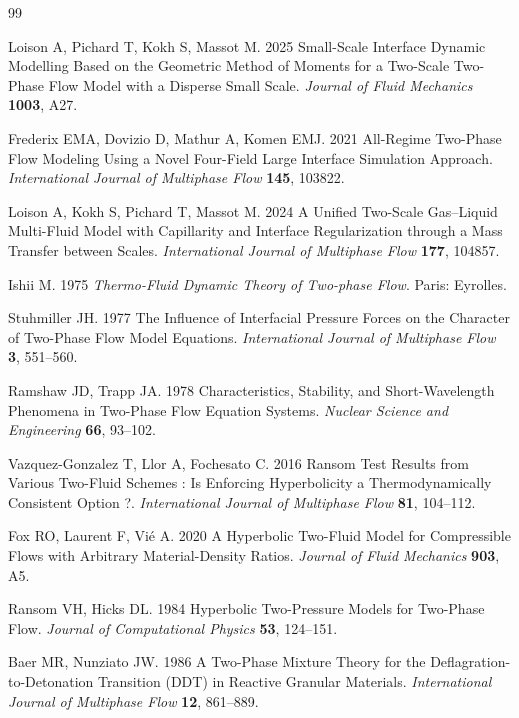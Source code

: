 \documentclass{myclass}
\begin{document}
\vskip2pc



\begin{thebibliography}{99}

Loison A, Pichard T, Kokh S, Massot M. 2025  Small-Scale Interface Dynamic
  Modelling Based on the Geometric Method of Moments for a Two-Scale Two-Phase
  Flow Model with a Disperse Small Scale. {\em Journal of Fluid Mechanics}
  \textbf{1003}, A27.

Frederix EMA, Dovizio D, Mathur A, Komen EMJ. 2021  All-Regime Two-Phase Flow
  Modeling Using a Novel Four-Field Large Interface Simulation Approach. {\em
  International Journal of Multiphase Flow} \textbf{145}, 103822.

Loison A, Kokh S, Pichard T, Massot M. 2024  A Unified Two-Scale Gas--Liquid
  Multi-Fluid Model with Capillarity and Interface Regularization through a
  Mass Transfer between Scales. {\em International Journal of Multiphase Flow}
  \textbf{177}, 104857.

Ishii M. 1975 {\em Thermo-Fluid {{Dynamic Theory}} of {{Two-phase Flow}}}.
Paris: Eyrolles.

Stuhmiller JH. 1977  The Influence of Interfacial Pressure Forces on the
  Character of Two-Phase Flow Model Equations. {\em International Journal of
  Multiphase Flow} \textbf{3}, 551--560.

Ramshaw JD, Trapp JA. 1978  Characteristics, {{Stability}}, and
  {{Short-Wavelength Phenomena}} in {{Two-Phase Flow Equation Systems}}. {\em
  Nuclear Science and Engineering} \textbf{66}, 93--102.

{Vazquez-Gonzalez} T, Llor A, Fochesato C. 2016  Ransom Test Results from
  Various Two-Fluid Schemes : {{Is}} Enforcing Hyperbolicity a
  Thermodynamically Consistent Option ?. {\em International Journal of
  Multiphase Flow} \textbf{81}, 104--112.

Fox RO, Laurent F, Vi{\'e} A. 2020  A Hyperbolic Two-Fluid Model for
  Compressible Flows with Arbitrary Material-Density Ratios. {\em Journal of
  Fluid Mechanics} \textbf{903}, A5.

Ransom VH, Hicks DL. 1984  Hyperbolic Two-Pressure Models for Two-Phase Flow.
  {\em Journal of Computational Physics} \textbf{53}, 124--151.

Baer MR, Nunziato JW. 1986  A Two-Phase Mixture Theory for the
  Deflagration-to-Detonation Transition ({{DDT}}) in Reactive Granular
  Materials. {\em International Journal of Multiphase Flow} \textbf{12},
  861--889.


\end{thebibliography}
\end{document}
